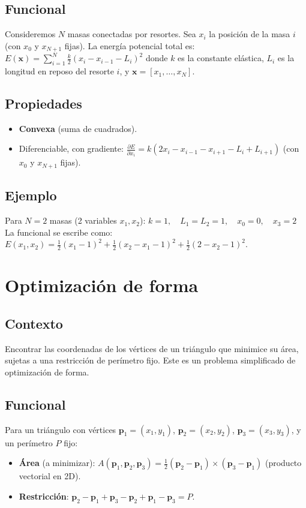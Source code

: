 \documentclass[12pt]{book}
\theoremstyle{definition}
\theoremstyle{plain}
\theoremstyle{remark}
\begin{document}
\subsection{Funcional}
Consideremos $ N $ masas conectadas por resortes. Sea $ x_i $ la posición de la masa $ i $ (con $ x_0 $ y $ x_{N+1} $ fijas). La energía potencial total es:
$
E(\mathbf{x}) = \sum_{i=1}^{N} \frac{k}{2} (x_i - x_{i-1} - L_i)^2
$
donde $ k $ es la constante elástica, $ L_i $ es la longitud en reposo del resorte $ i $, y $ \mathbf{x} = [x_1, \dots, x_N] $.

\subsection{Propiedades}
\begin{itemize}
    \item \textbf{Convexa} (suma de cuadrados).
    \item Diferenciable, con gradiente:
    $
    \frac{\partial E}{\partial x_i} = k \left( 2x_i - x_{i-1} - x_{i+1} - L_i + L_{i+1} \right)
    $
    (con $ x_0 $ y $ x_{N+1} $ fijas).
\end{itemize}

\subsection{Ejemplo}
Para $ N = 2 $ masas (2 variables $ x_1, x_2 $):
$
k = 1, \quad L_1 = L_2 = 1, \quad x_0 = 0, \quad x_3 = 2
$
La funcional se escribe como:
$
E(x_1, x_2) = \frac{1}{2}(x_1 - 1)^2 + \frac{1}{2}(x_2 - x_1 - 1)^2 + \frac{1}{2}(2 - x_2 - 1)^2.
$

\section{Optimización de forma} %
\subsection{Contexto}
Encontrar las coordenadas de los vértices de un triángulo que minimice su área, sujetas a una restricción de perímetro fijo. Este es un problema simplificado de optimización de forma.

\subsection{Funcional}
Para un triángulo con vértices $ \mathbf{p}_1 = (x_1, y_1) $, $ \mathbf{p}_2 = (x_2, y_2) $, $ \mathbf{p}_3 = (x_3, y_3) $, y un perímetro $ P $ fijo:
\begin{itemize}
    \item \textbf{Área} (a minimizar):
    $
    A(\mathbf{p}_1, \mathbf{p}_2, \mathbf{p}_3) = \frac{1}{2}  (\mathbf{p}_2 - \mathbf{p}_1) \times (\mathbf{p}_3 - \mathbf{p}_1) 
    $
    (producto vectorial en 2D).
    \item \textbf{Restricción}:
    $
    \mathbf{p}_2 - \mathbf{p}_1 + \mathbf{p}_3 - \mathbf{p}_2 + \mathbf{p}_1 - \mathbf{p}_3 = P.
    $
\end{itemize}
\end{document}

